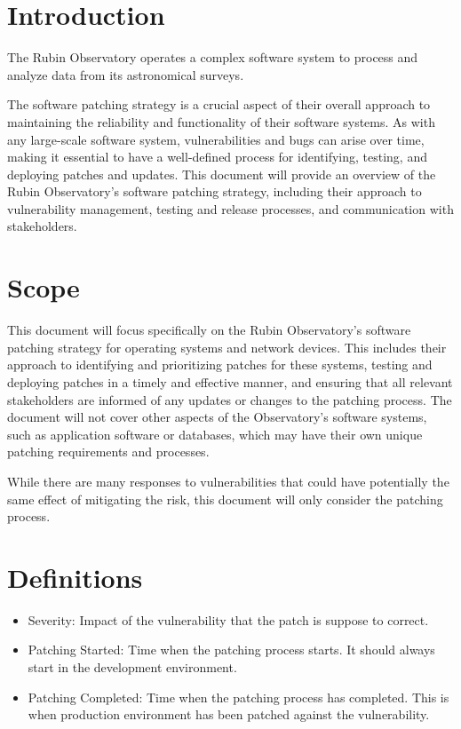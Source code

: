 \section{Introduction}


The Rubin Observatory operates a complex software system to process and analyze data from its astronomical surveys. 

The software patching strategy is a crucial aspect of their overall approach to maintaining the reliability and functionality of their software systems. As with any large-scale software system, vulnerabilities and bugs can arise over time, making it essential to have a well-defined process for identifying, testing, and deploying patches and updates. This document will provide an overview of the Rubin Observatory's software patching strategy, including their approach to vulnerability management, testing and release processes, and communication with stakeholders.

\section{Scope}

This document will focus specifically on the Rubin Observatory's software patching strategy for operating systems and network devices. This includes their approach to identifying and prioritizing patches for these systems, testing and deploying patches in a timely and effective manner, and ensuring that all relevant stakeholders are informed of any updates or changes to the patching process. The document will not cover other aspects of the Observatory's software systems, such as application software or databases, which may have their own unique patching requirements and processes.

While there are many responses to vulnerabilities that could have potentially the same effect of mitigating the risk, this document will only consider the patching process. 


\section{Definitions}

\begin{itemize}
    \item Severity: Impact of the vulnerability that the patch is suppose to correct. 
    \item Patching Started: Time when the patching process starts. It should always start in the development environment.
    \item Patching Completed: Time when the patching process has completed. This is when production environment has been patched against the vulnerability.
\end{itemize}

